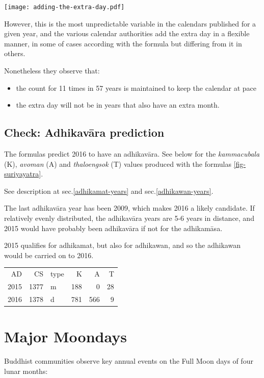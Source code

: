 \documentclass[11pt,oneside]{memoir-article}
\begin{document}
\texttt{[image: adding-the-extra-day.pdf]}

However, this is the most unpredictable variable in the calendars
published for a given year, and the various calendar authorities add
the extra day in a flexible manner, in some of cases according with
the formula but differing from it in others.

Nonetheless they observe that:

\begin{itemize}
\item the count for 11 times in 57 years is maintained to keep the
calendar at pace
\item the extra day will not be in years that also have an extra month.
\end{itemize}

\subsection{Check: Adhikavāra prediction}
\label{sec-1-3-1}
\label{adhikavara-prediction}

The formulas predict 2016 to have an adhikavāra. See below for the
\emph{kammacubala} (K), \emph{avoman} (A) and \emph{thaloengsok} (T) values produced
with the formulas \ref{fig-suriyayatra}.

See description at sec.\ref{adhikamat-years} and
sec.\ref{adhikawan-years}.

The last adhikavāra year has been 2009, which makes 2016 a likely
candidate. If relatively evenly distributed, the adhikavāra years are
5-6 years in distance, and 2015 would have probably been adhikavāra if
not for the adhikamāsa.

2015 qualifies for adhikamat, but also for adhikawan, and so the
adhikawan would be carried on to 2016.

\begin{center}
\begin{tabular}{rrlrrr}
AD & CS & type & K & A & T\\
2015 & 1377 & m & 188 & 0 & 28\\
2016 & 1378 & d & 781 & 566 & 9\\
\end{tabular}
\end{center}
\section{Major Moondays}
\label{sec-1-4}
\label{major-moondays}

Buddhist communities observe key annual events on the Full Moon
days of four lunar months:
\end{document}
